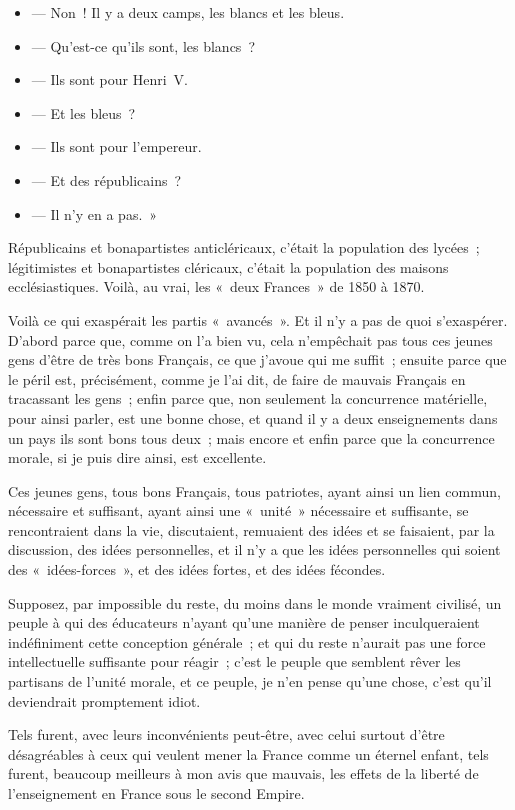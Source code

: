 \documentclass[french,twoside]{book} %
\begin{document}
\begin{itemize}[itemsep=0pt,]
\item  — Non ! Il y a deux camps, les blancs et les bleus.
\item  — Qu’est-ce qu’ils sont, les blancs ?
\item  — Ils sont pour Henri V.
\item  — Et les bleus ?
\item  — Ils sont pour l’empereur.
\item  — Et des républicains ?
\item  — Il n’y en a pas. »
\end{itemize}

\noindent Républicains et bonapartistes anticléricaux, c’était la population des lycées ; légitimistes et bonapartistes cléricaux, c’était la population des maisons ecclésiastiques. Voilà, au vrai, les « deux Frances » de 1850 à 1870.\par
Voilà ce qui exaspérait les partis « avancés ». Et  il n’y a pas de quoi s’exaspérer. D’abord parce que, comme on l’a bien vu, cela n’empêchait pas tous ces jeunes gens d’être de très bons Français, ce que j’avoue qui me suffit ; ensuite parce que le péril est, précisément, comme je l’ai dit, de faire de mauvais Français en tracassant les gens ; enfin parce que, non seulement la concurrence matérielle, pour ainsi parler, est une bonne chose, et quand il y a deux enseignements dans un pays ils sont bons tous deux ; mais encore et enfin parce que la concurrence morale, si je puis dire ainsi, est excellente.\par
Ces jeunes gens, tous bons Français, tous patriotes, ayant ainsi un lien commun, nécessaire et suffisant, ayant ainsi une « unité » nécessaire et suffisante, se rencontraient dans la vie, discutaient, remuaient des idées et se faisaient, par la discussion, des idées personnelles, et il n’y a que les idées personnelles qui soient des « idées-forces », et des idées fortes, et des idées fécondes.\par
Supposez, par impossible du reste, du moins dans le monde vraiment civilisé, un peuple à qui des éducateurs n’ayant qu’une manière de penser inculqueraient indéfiniment cette conception générale ; et qui du reste n’aurait pas une force intellectuelle suffisante pour réagir ; c’est le peuple que semblent rêver les partisans de l’unité  morale, et ce peuple, je n’en pense qu’une chose, c’est qu’il deviendrait promptement idiot.\par
Tels furent, avec leurs inconvénients peut-être, avec celui surtout d’être désagréables à ceux qui veulent mener la France comme un éternel enfant, tels furent, beaucoup meilleurs à mon avis que mauvais, les effets de la liberté de l’enseignement en France sous le second Empire.\par
\end{document}
